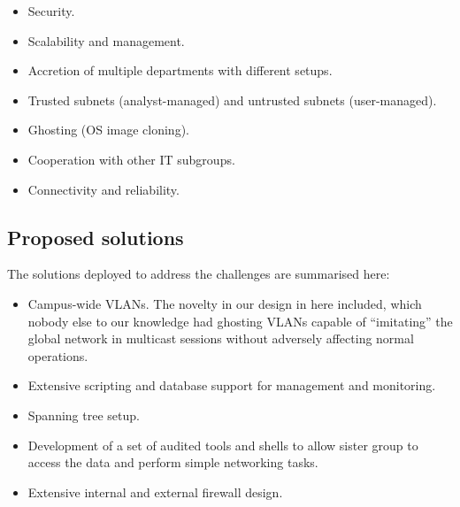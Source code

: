 \begin{itemize}
	\item 
Security.

	\item 
Scalability and management.

	\item 
Accretion of multiple departments with different setups.

	\item 
Trusted subnets (analyst-managed) and untrusted subnets (user-managed).

	\item 
Ghosting (OS image cloning).

	\item 
Cooperation with other IT subgroups.

	\item 
Connectivity and reliability.
\end{itemize}

\subsection{Proposed solutions}
\label{sect:solutions}

The solutions deployed to address the challenges are summarised here:

\begin{itemize}
	\item 
Campus-wide VLANs. The novelty in our design in here included, which
nobody else to our knowledge had ghosting VLANs capable of ``imitating''
the global network in multicast sessions without adversely
affecting normal operations.

	\item 
Extensive scripting and database support
for management and monitoring.

	\item 
Spanning tree setup.

	\item 
Development of a set of audited tools and shells to allow
sister group to access the data and perform
simple networking tasks.

	\item 
Extensive internal and external firewall design.
\end{itemize}


